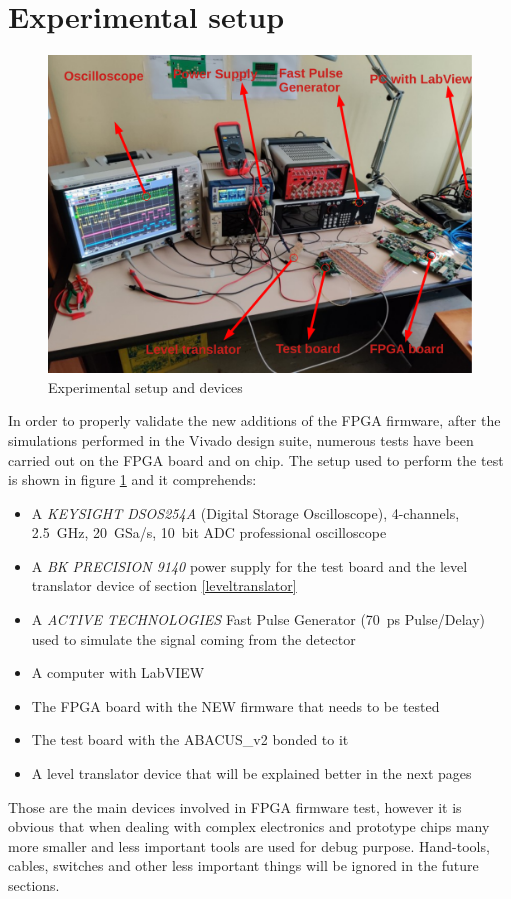 \section{Experimental setup}\label{testbench}
\begin{figure}[H]
	\centering
	\includegraphics[width=0.7\linewidth]{IMG/ch5/TESTBENCH}
	\caption{Experimental setup and devices}
	\label{fig:testbench}
\end{figure}
In order to properly validate the new additions of the FPGA firmware, after the simulations performed in the Vivado design suite, numerous tests have been carried out on the FPGA board and on chip.
The setup used to perform the test is shown in figure \ref{fig:testbench} and it comprehends:
\begin{itemize}
	\item A \textit{KEYSIGHT DSOS254A} (Digital Storage Oscilloscope), 4-channels, 2.5~GHz, 20~GSa/s, 10~bit ADC professional oscilloscope
	\item A \textit{BK PRECISION 9140} power supply for the test board and the level translator device of section \ref{leveltranslator}
	\item A \textit{ACTIVE TECHNOLOGIES} Fast Pulse Generator (70~ps Pulse/Delay) used to simulate the signal coming from the detector
	\item A computer with LabVIEW 
	\item The FPGA board with the NEW firmware that needs to be tested
	\item The test board with the ABACUS\_v2 bonded to it
	\item A level translator device that will be explained better in the next pages
\end{itemize}
\noindent Those are the main devices involved in FPGA firmware test, however it is obvious that when dealing with complex electronics and prototype chips many more smaller and less important tools are used for debug purpose. Hand-tools, cables, switches and other less important things will be ignored in the future sections.

